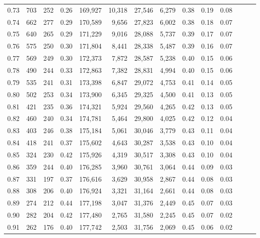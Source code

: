 \begin{tabular}{rrrrrrrrrrrrrr}
0.73 &    703 &  252 &  0.26 &  169,927 &   10,318 &  27,546 &   6,279 &  0.38 &  0.19 &      0.08 \\
0.74 &    662 &  277 &  0.29 &  170,589 &    9,656 &  27,823 &   6,002 &  0.38 &  0.18 &      0.07 \\
0.75 &    640 &  265 &  0.29 &  171,229 &    9,016 &  28,088 &   5,737 &  0.39 &  0.17 &      0.07 \\
0.76 &    575 &  250 &  0.30 &  171,804 &    8,441 &  28,338 &   5,487 &  0.39 &  0.16 &      0.07 \\
0.77 &    569 &  249 &  0.30 &  172,373 &    7,872 &  28,587 &   5,238 &  0.40 &  0.15 &      0.06 \\
0.78 &    490 &  244 &  0.33 &  172,863 &    7,382 &  28,831 &   4,994 &  0.40 &  0.15 &      0.06 \\
0.79 &    535 &  241 &  0.31 &  173,398 &    6,847 &  29,072 &   4,753 &  0.41 &  0.14 &      0.05 \\
0.80 &    502 &  253 &  0.34 &  173,900 &    6,345 &  29,325 &   4,500 &  0.41 &  0.13 &      0.05 \\
0.81 &    421 &  235 &  0.36 &  174,321 &    5,924 &  29,560 &   4,265 &  0.42 &  0.13 &      0.05 \\
0.82 &    460 &  240 &  0.34 &  174,781 &    5,464 &  29,800 &   4,025 &  0.42 &  0.12 &      0.04 \\
0.83 &    403 &  246 &  0.38 &  175,184 &    5,061 &  30,046 &   3,779 &  0.43 &  0.11 &      0.04 \\
0.84 &    418 &  241 &  0.37 &  175,602 &    4,643 &  30,287 &   3,538 &  0.43 &  0.10 &      0.04 \\
0.85 &    324 &  230 &  0.42 &  175,926 &    4,319 &  30,517 &   3,308 &  0.43 &  0.10 &      0.04 \\
0.86 &    359 &  244 &  0.40 &  176,285 &    3,960 &  30,761 &   3,064 &  0.44 &  0.09 &      0.03 \\
0.87 &    331 &  197 &  0.37 &  176,616 &    3,629 &  30,958 &   2,867 &  0.44 &  0.08 &      0.03 \\
0.88 &    308 &  206 &  0.40 &  176,924 &    3,321 &  31,164 &   2,661 &  0.44 &  0.08 &      0.03 \\
0.89 &    274 &  212 &  0.44 &  177,198 &    3,047 &  31,376 &   2,449 &  0.45 &  0.07 &      0.03 \\
0.90 &    282 &  204 &  0.42 &  177,480 &    2,765 &  31,580 &   2,245 &  0.45 &  0.07 &      0.02 \\
0.91 &    262 &  176 &  0.40 &  177,742 &    2,503 &  31,756 &   2,069 &  0.45 &  0.06 &      0.02 \\

\end{tabular}
